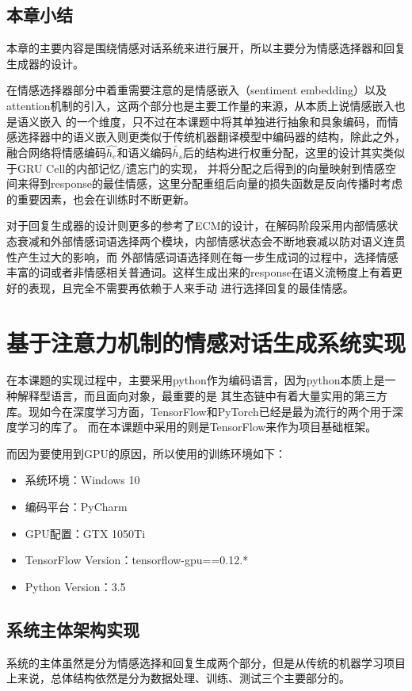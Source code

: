 \documentclass[supercite]{HustGraduPaper}
\theoremstyle{definition}
\begin{document}
\subsection{本章小结}
本章的主要内容是围绕情感对话系统来进行展开，所以主要分为情感选择器和回复生成器的设计。

在情感选择器部分中着重需要注意的是情感嵌入（sentiment embedding）以及attention机制的引入，这两个部分也是主要工作量的来源，从本质上说情感嵌入也是语义嵌入
的一个维度，只不过在本课题中将其单独进行抽象和具象编码，而情感选择器中的语义嵌入则更类似于传统机器翻译模型中编码器的结构，除此之外，
融合网络将情感编码$\widehat{h_e}$和语义编码$\widetilde{h_s}$后的结构进行权重分配，这里的设计其实类似于GRU Cell的内部记忆/遗忘门的实现，
并将分配之后得到的向量映射到情感空间来得到response的最佳情感，这里分配重组后向量的损失函数是反向传播时考虑的重要因素，也会在训练时不断更新。

对于回复生成器的设计则更多的参考了ECM\cite{DBLP:journals/corr/ZhouHZZL17}的设计，在解码阶段采用内部情感状态衰减和外部情感词语选择两个模块，内部情感状态会不断地衰减以防对语义连贯性产生过大的影响，而
外部情感词语选择则在每一步生成词的过程中，选择情感丰富的词或者非情感相关普通词。这样生成出来的response在语义流畅度上有着更好的表现，且完全不需要再依赖于人来手动
进行选择回复的最佳情感。

\section{基于注意力机制的情感对话生成系统实现}
在本课题的实现过程中，主要采用python作为编码语言，因为python本质上是一种解释型语言，而且面向对象，最重要的是
其生态链中有着大量实用的第三方库。现如今在深度学习方面，TensorFlow和PyTorch已经是最为流行的两个用于深度学习的库了。
而在本课题中采用的则是TensorFlow来作为项目基础框架。

而因为要使用到GPU的原因，所以使用的训练环境如下：
\begin{itemize}
  \item 系统环境：Windows 10
  \item 编码平台：PyCharm
  \item GPU配置：GTX 1050Ti
  \item TensorFlow Version：tensorflow-gpu==0.12.*
  \item Python Version：3.5
\end{itemize}

\subsection{系统主体架构实现}
系统的主体虽然是分为情感选择和回复生成两个部分，但是从传统的机器学习项目上来说，总体结构依然是分为数据处理、训练、测试三个主要部分的。
\end{document}
